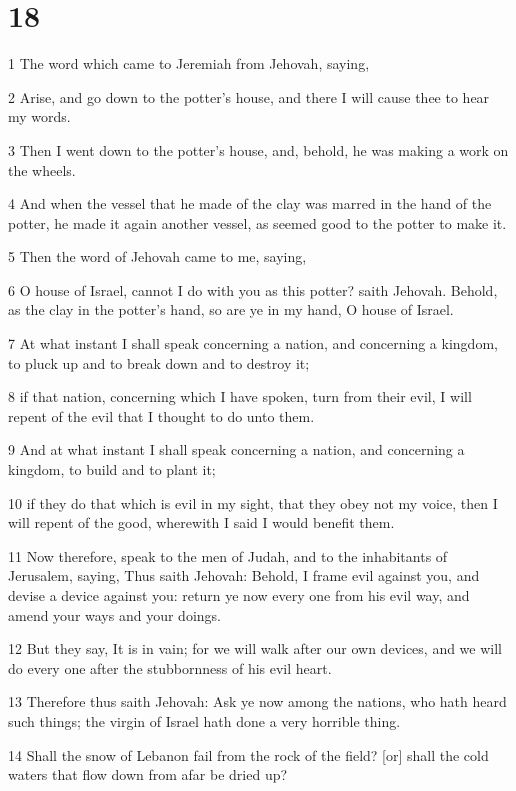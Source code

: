 \chapter{18}

\par 1 The word which came to Jeremiah from Jehovah, saying,
\par 2 Arise, and go down to the potter's house, and there I will cause thee to hear my words.
\par 3 Then I went down to the potter's house, and, behold, he was making a work on the wheels.
\par 4 And when the vessel that he made of the clay was marred in the hand of the potter, he made it again another vessel, as seemed good to the potter to make it.
\par 5 Then the word of Jehovah came to me, saying,
\par 6 O house of Israel, cannot I do with you as this potter? saith Jehovah. Behold, as the clay in the potter's hand, so are ye in my hand, O house of Israel.
\par 7 At what instant I shall speak concerning a nation, and concerning a kingdom, to pluck up and to break down and to destroy it;
\par 8 if that nation, concerning which I have spoken, turn from their evil, I will repent of the evil that I thought to do unto them.
\par 9 And at what instant I shall speak concerning a nation, and concerning a kingdom, to build and to plant it;
\par 10 if they do that which is evil in my sight, that they obey not my voice, then I will repent of the good, wherewith I said I would benefit them.
\par 11 Now therefore, speak to the men of Judah, and to the inhabitants of Jerusalem, saying, Thus saith Jehovah: Behold, I frame evil against you, and devise a device against you: return ye now every one from his evil way, and amend your ways and your doings.
\par 12 But they say, It is in vain; for we will walk after our own devices, and we will do every one after the stubbornness of his evil heart.
\par 13 Therefore thus saith Jehovah: Ask ye now among the nations, who hath heard such things; the virgin of Israel hath done a very horrible thing.
\par 14 Shall the snow of Lebanon fail from the rock of the field? [or] shall the cold waters that flow down from afar be dried up?
